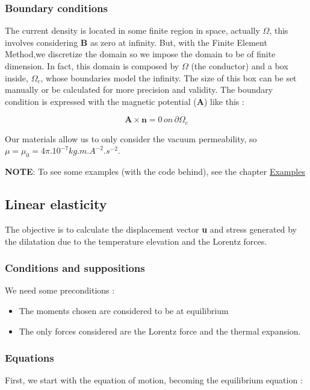 \documentclass[11pt]{amsart}
\newcommand{\admonition}[2]{\textbf{#1}: {#2}}
\begin{document}
\hypertarget{x-boundary-conditions}{\subsubsection{Boundary conditions}}
The current density is located in some finite region in space, actually $\Omega$, this involves considering \textbf{B} as zero at infinity.
But, with the Finite Element Method,we discretize the domain so we impose the domain to be of finite dimension.
In fact, this domain is composed by $\Omega$ (the conductor) and a box inside, $\Omega_{c}$, whose boundaries model the infinity.
The size of this box can be set manually or be calculated for more precision and validity.
The boundary condition is expressed with the magnetic potential (\textbf{A}) like this :



\[
\textbf{A}\times\textbf{n}=0\, on\, \partial\Omega_{c}
\]



Our materials allow us to only consider the vacuum permeability, so $\mu=\mu_{0}=4\pi.10^{-7} kg.m.A^{-2} .s^{-2}$.


\admonition{NOTE}{To see some examples (with the code behind), see the chapter \href{/examples}{Examples}}
\hypertarget{x-linear-elasticity}{\subsection{Linear elasticity}}
The objective is to calculate the displacement vector \textbf{u} and stress generated by the dilatation due to the temperature elevation and the Lorentz forces.


\hypertarget{x-conditions-and-suppositions}{\subsubsection{Conditions and suppositions}}
We need some preconditions :


\begin{itemize}

\item The moments chosen are considered to be at equilibrium

\item The only forces considered are the Lorentz force and the thermal expansion.

\end{itemize}


\hypertarget{x-equations}{\subsubsection{Equations}}
First, we start with the equation of motion, becoming the equilibrium equation :
\end{document}
